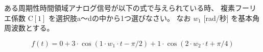 ある周期性時間領域アナログ信号が以下の式で与えられている時、
複素フーリエ係数 $\textrm{C}[1]$ を選択肢a〜dの中から1つ選びなさい。
なお $w_1$ [rad/秒] を基本角周波数とする。

\[
f(t) = 
0
+ 3 \cdot \cos( 1 \cdot w_1 \cdot t - \pi/2)
+ 1 \cdot \cos( 2 \cdot w_2 \cdot t + \pi/4)
\]
